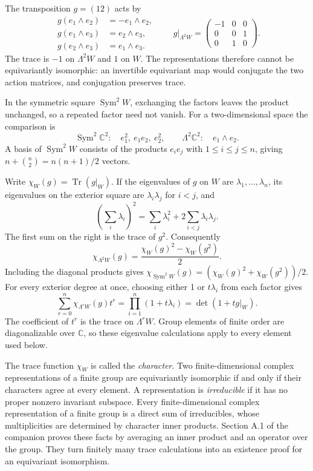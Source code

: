 \documentclass[11pt,a4paper]{article}
\begin{document}
The transposition $g=(12)$ acts by
\[
\begin{aligned}
g(e_1\wedge e_2)&=-e_1\wedge e_2,\\
g(e_1\wedge e_3)&= e_2\wedge e_3,\\
g(e_2\wedge e_3)&= e_1\wedge e_3.
\end{aligned}
\qquad
g|_{\Lambda^2W}=\begin{pmatrix}-1&0&0\\0&0&1\\0&1&0\end{pmatrix}.
\]
The trace is $-1$ on $\Lambda^2W$ and $1$ on $W$. The representations therefore cannot be equivariantly isomorphic: an invertible equivariant map would conjugate the two action matrices, and conjugation preserves trace.

In the symmetric square \(\operatorname{Sym}^2W\), exchanging the factors leaves the product unchanged, so a repeated factor need not vanish. For a two-dimensional space the comparison is
\[
\operatorname{Sym}^2\mathbb C^2:
     \quad e_1^2,\ e_1e_2,\ e_2^2,
\qquad
\Lambda^2\mathbb C^2:\quad e_1\wedge e_2.
\]
A basis of \(\operatorname{Sym}^2W\) consists of the products \(e_i e_j\) with \(1\leq i\leq j\leq n\), giving \(n+\binom n2=n(n+1)/2\) vectors.

Write \(\chi_W(g)=\operatorname{Tr}(g|_W)\). If the eigenvalues of \(g\) on \(W\) are \(\lambda_1,\ldots,\lambda_n\), its eigenvalues on the exterior square are \(\lambda_i\lambda_j\) for \(i<j\), and
\[
\left(\sum_i\lambda_i\right)^2
=\sum_i\lambda_i^2+2\sum_{i<j}\lambda_i\lambda_j.
\]
The first sum on the right is the trace of \(g^2\). Consequently
\begin{equation}\label{eq:exterior-square}
\chi_{\Lambda^2W}(g)
=\frac{\chi_W(g)^2-\chi_W(g^2)}2.
\end{equation}
Including the diagonal products gives \(\chi_{\operatorname{Sym}^2W}(g)=(\chi_W(g)^2+\chi_W(g^2))/2\). For every exterior degree at once, choosing either 1 or \(t\lambda_i\) from each factor gives
\begin{equation}\label{eq:exterior-generating}
\sum_{r=0}^{n}\chi_{\Lambda^rW}(g)t^r
   =\prod_{i=1}^{n}(1+t\lambda_i)=\det(1+tg|_W).
\end{equation}
The coefficient of \(t^r\) is the trace on \(\Lambda^rW\). Group elements of finite order are diagonalizable over \(\mathbb C\), so these eigenvalue calculations apply to every element used below.

The trace function \(\chi_W\) is called the \emph{character}. Two finite-dimensional complex representations of a finite group are equivariantly isomorphic if and only if their characters agree at every element. A representation is \emph{irreducible} if it has no proper nonzero invariant subspace. Every finite-dimensional complex representation of a finite group is a direct sum of irreducibles, whose multiplicities are determined by character inner products. Section A.1 of the companion \citep{Companion2026} proves these facts by averaging an inner product and an operator over the group. They turn finitely many trace calculations into an existence proof for an equivariant isomorphism.
\end{document}
